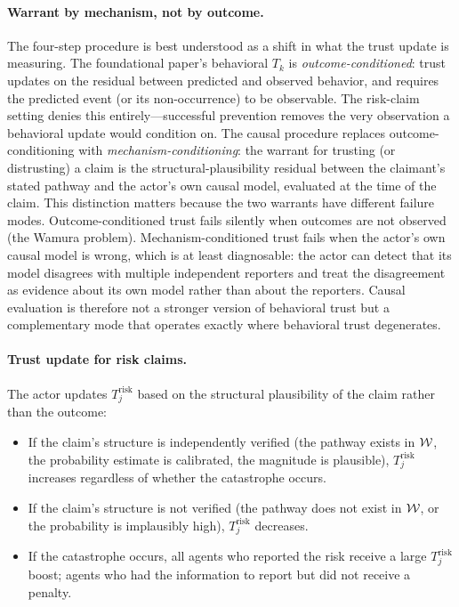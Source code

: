 \paragraph{Warrant by mechanism, not by outcome.} The four-step procedure
is best understood as a shift in what the trust update is measuring. The
foundational paper's behavioral $T_k$ is \emph{outcome-conditioned}: trust
updates on the residual between predicted and observed behavior, and
requires the predicted event (or its non-occurrence) to be observable. The
risk-claim setting denies this entirely---successful prevention removes
the very observation a behavioral update would condition on. The causal
procedure replaces outcome-conditioning with \emph{mechanism-conditioning}:
the warrant for trusting (or distrusting) a claim is the
structural-plausibility residual between the claimant's stated pathway and
the actor's own causal model, evaluated at the time of the claim. This
distinction matters because the two warrants have different failure modes.
Outcome-conditioned trust fails silently when outcomes are not observed
(the Wamura problem). Mechanism-conditioned trust fails when the actor's
own causal model is wrong, which is at least diagnosable: the actor can
detect that its model disagrees with multiple independent reporters and
treat the disagreement as evidence about its own model rather than about
the reporters. Causal evaluation is therefore not a stronger version of
behavioral trust but a complementary mode that operates exactly where
behavioral trust degenerates.

\paragraph{Trust update for risk claims.} The actor updates
$T_j^{\mathrm{risk}}$ based on the structural plausibility of the claim
rather than the outcome:
\begin{itemize}
\item If the claim's structure is independently verified (the pathway exists
  in $\mathcal{W}$, the probability estimate is calibrated, the magnitude is
  plausible), $T_j^{\mathrm{risk}}$ increases regardless of whether the
  catastrophe occurs.
\item If the claim's structure is not verified (the pathway does not exist in
  $\mathcal{W}$, or the probability is implausibly high),
  $T_j^{\mathrm{risk}}$ decreases.
\item If the catastrophe occurs, all agents who reported the risk receive a
  large $T_j^{\mathrm{risk}}$ boost; agents who had the information to
  report but did not receive a penalty.
\end{itemize}

